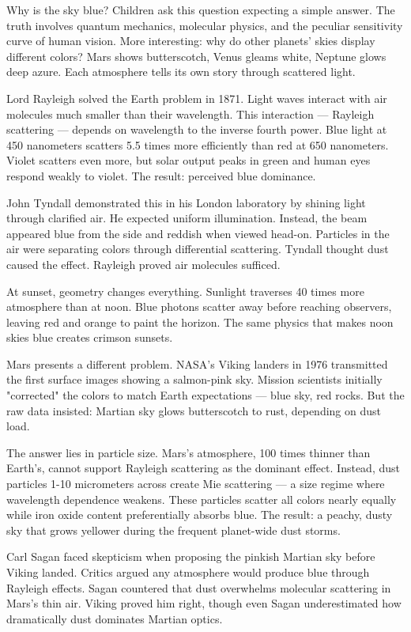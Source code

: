 Why is the sky blue? Children ask this question expecting a simple answer. The truth involves quantum mechanics, molecular physics, and the peculiar sensitivity curve of human vision. More interesting: why do other planets' skies display different colors? Mars shows butterscotch, Venus gleams white, Neptune glows deep azure. Each atmosphere tells its own story through scattered light.

Lord Rayleigh solved the Earth problem in 1871. Light waves interact with air molecules much smaller than their wavelength. This interaction — Rayleigh scattering — depends on wavelength to the inverse fourth power. Blue light at 450 nanometers scatters 5.5 times more efficiently than red at 650 nanometers. Violet scatters even more, but solar output peaks in green and human eyes respond weakly to violet. The result: perceived blue dominance.

John Tyndall demonstrated this in his London laboratory by shining light through clarified air. He expected uniform illumination. Instead, the beam appeared blue from the side and reddish when viewed head-on. Particles in the air were separating colors through differential scattering. Tyndall thought dust caused the effect. Rayleigh proved air molecules sufficed.

At sunset, geometry changes everything. Sunlight traverses 40 times more atmosphere than at noon. Blue photons scatter away before reaching observers, leaving red and orange to paint the horizon. The same physics that makes noon skies blue creates crimson sunsets.

Mars presents a different problem. NASA's Viking landers in 1976 transmitted the first surface images showing a salmon-pink sky. Mission scientists initially "corrected" the colors to match Earth expectations — blue sky, red rocks. But the raw data insisted: Martian sky glows butterscotch to rust, depending on dust load.

The answer lies in particle size. Mars's atmosphere, 100 times thinner than Earth's, cannot support Rayleigh scattering as the dominant effect. Instead, dust particles 1-10 micrometers across create Mie scattering — a size regime where wavelength dependence weakens. These particles scatter all colors nearly equally while iron oxide content preferentially absorbs blue. The result: a peachy, dusty sky that grows yellower during the frequent planet-wide dust storms.

Carl Sagan faced skepticism when proposing the pinkish Martian sky before Viking landed. Critics argued any atmosphere would produce blue through Rayleigh effects. Sagan countered that dust overwhelms molecular scattering in Mars's thin air. Viking proved him right, though even Sagan underestimated how dramatically dust dominates Martian optics.

